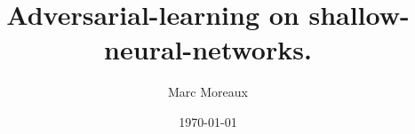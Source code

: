
% 




\usepackage{amsmath}
\usepackage{graphicx}
\usepackage{fancyref}
\usepackage{amsmath}
\usepackage{listings}
\usepackage{url}
\usepackage{float}
\usepackage{amssymb}
\usepackage{rotating}
\usepackage{multirow}
\usepackage[toc,page]{appendix}

\usepackage{tikz}
\usetikzlibrary{shapes}
\usepackage[ruled,linesnumbered,vlined]{algorithm2e}

\usepackage{verbatim}

\newcommand{\norm}[1]{\left\lVert#1\right\rVert}
\newcommand{\argmin}{\arg\!\min}


\makeatletter
{}
\makeatother


\title{Adversarial-learning on shallow-neural-networks.}

\author{Marc Moreaux}

\date{\today}






\cleardoublepage
{}
\pagestyle{fancy} %
\tableofcontents

\cleardoublepage




% 
















